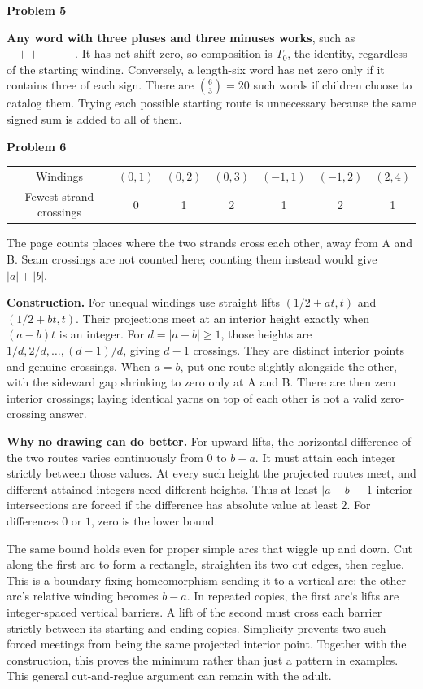\documentclass[11pt,letterpaper]{article}
\newcommand{\prob}[1]{\par\vspace{3pt}\textbf{Problem #1}\par}
\begin{document}
\prob{5}
\textbf{Any word with three pluses and three minuses works}, such as $+++---$.
It has net shift zero, so composition is $T_0$, the identity, regardless of the
starting winding. Conversely, a length-six word has net zero only if it contains
three of each sign. There are $\binom63=20$ such words if children choose to
catalog them. Trying each possible starting route is unnecessary because the
same signed sum is added to all of them.
\newpage
\prob{6}
\begin{center}
\begin{tabular}{@{}ccccccc@{}}\toprule
Windings & $(0,1)$ & $(0,2)$ & $(0,3)$ & $(-1,1)$ & $(-1,2)$ & $(2,4)$\\
Fewest strand crossings & 0 & 1 & 2 & 1 & 2 & 1\\\bottomrule
\end{tabular}
\end{center}
The page counts places where the two strands cross each other, away from A and
B. Seam crossings are not counted here; counting them instead would give $|a|+|b|$.

\textbf{Construction.} For unequal windings use straight lifts
$(1/2+at,t)$ and $(1/2+bt,t)$. Their projections meet at an interior height
exactly when $(a-b)t$ is an integer. For $d=|a-b|\ge1$, those heights are
$1/d,2/d,\ldots,(d-1)/d$, giving $d-1$ crossings. They are distinct interior
points and genuine crossings. When $a=b$, put one route slightly alongside the
other, with the sideward gap shrinking to zero only at A and B. There are then
zero interior crossings; laying identical yarns on top of each other is not a
valid zero-crossing answer.

\textbf{Why no drawing can do better.} For upward lifts, the horizontal
difference of the two routes varies continuously from $0$ to $b-a$. It must
attain each integer strictly between those values. At every such height the
projected routes meet, and different attained integers need different heights.
Thus at least $|a-b|-1$ interior intersections are forced if the difference has
absolute value at least $2$. For differences $0$ or $1$, zero is the lower bound.

The same bound holds even for proper simple arcs that wiggle up and down.
Cut along the first arc to form a rectangle, straighten its two cut edges, then
reglue. This is a boundary-fixing homeomorphism sending it to a vertical arc;
the other arc's relative winding becomes $b-a$. In repeated copies, the first
arc's lifts are integer-spaced vertical barriers. A lift of the second must cross
each barrier strictly between its starting and ending copies. Simplicity prevents
two such forced meetings from being the same projected interior point. Together
with the construction, this proves the minimum rather than just a pattern in
examples. This general cut-and-reglue argument can remain with the adult.
\end{document}
